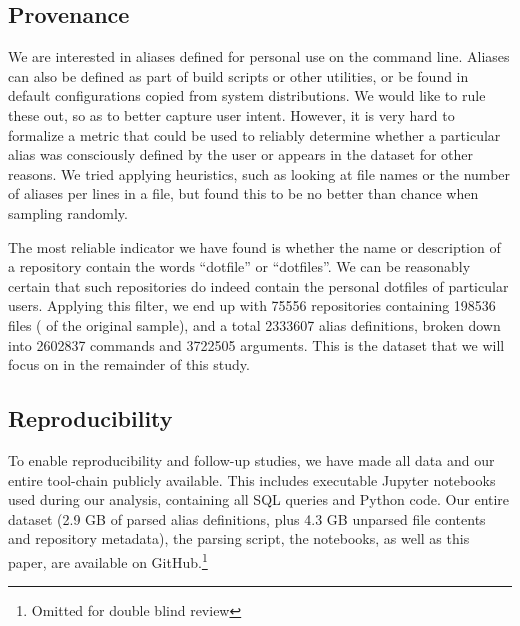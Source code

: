 \subsection{Provenance}

We are interested in aliases defined for personal use on the command line.
Aliases can also be defined as part of build scripts or other utilities, or be found in default configurations copied from system distributions.
We would like to rule these out, so as to better capture user intent.
However, it is very hard to formalize a metric that could be used to reliably determine whether a particular alias was consciously defined by the user or appears in the dataset for other reasons.
We tried applying heuristics, such as looking at file names or the number of aliases per lines in a file, but found this to be no better than chance when sampling randomly.

The most reliable indicator we have found is whether the name or description of a repository contain the words ``dotfile'' or ``dotfiles''.
We can be reasonably certain that such repositories do indeed contain the personal dotfiles of particular users.
Applying this filter, we end up with \num{75556} repositories containing \num{198536} files ( of the original sample), and a total \num{2333607} alias definitions, broken down into \num{2602837} commands and \num{3722505} arguments.
This is the dataset that we will focus on in the remainder of this study.

\subsection{Reproducibility}

To enable reproducibility and follow-up studies, we have made all data and our entire tool-chain publicly available.
This includes executable Jupyter notebooks used during our analysis, containing all SQL queries and Python code.
Our entire dataset (2.9 GB of parsed alias definitions, plus 4.3 GB unparsed file contents and repository metadata), the parsing script, the notebooks, as well as this paper, are available on GitHub.\footnote{Omitted for double blind review}



